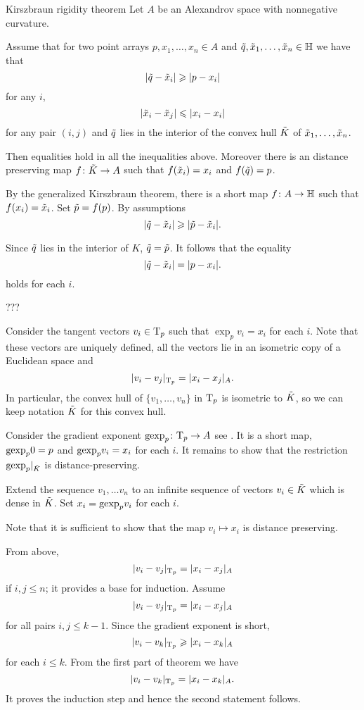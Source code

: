 \begin{thm}{Kirszbraun rigidity theorem}\label{thm:kirszbraun-rigid}
Let $A$ be an Alexandrov space with nonnegative curvature.

Assume that for two point arrays $p,x_1,\dots,x_n\in A$ and $\~q, \~x_1,\dots,\~x_n\in \HH$ we have that 
\[|\~q-\~x_i|\ge |p-x_i|\]
for any $i$,
\[|\~x_i-\~x_j|\le |x_i-x_i|\]
for any pair $(i,j)$
and $\~q$ lies in the interior of the convex hull $\~K$ of $\~x_1,\dots,\~x_n$.

Then equalities hold in all the inequalities above.
Moreover there is an distance preserving map $f\:\~K\to A$ such that $f(\~x_i)=x_i$ and $f(\~q)=p$. 
\end{thm}

By the generalized Kirszbraun theorem, there is a short map $f\:A\to \HH$
such that $f(x_i)=\~x_i$.
Set  $\~p=f(p)$.
By assumptions
\[|\~q-\~x_i|\ge |\~p-\~x_i|.\]

Since $\~q$ lies in the interior of $K$, $\~q=\~p$.
It follows that the equality 
\[|\~q-\~x_i|= |p-x_i|.\]
holds for each $i$.

???

Consider the tangent vectors $v_i\in\T_p$ such that $\exp_pv_i=x_i$ for each $i$.
Note that these vectors are uniquely defined,
all  the vectors lie in an isometric copy of a Euclidean space
and 
\[|v_i-v_j|_{\T_p}=|x_i-x_j|_A.\]
In particular, the convex hull of $\{v_1,\dots,v_n\}$ in $\T_p$ is isometric to $\~K$,
so we can keep notation  $\~K$ for this convex hull.

Consider the gradient exponent $\gexp_p\:\T_p\to A$ see \cite{AKP-book}.
It is a short map, $\gexp_p0=p$ and $\gexp_p v_i=x_i$ for each $i$.
It remains to show that the restriction $\gexp_p|_{\~K}$ is distance-preserving.

Extend the sequence $v_1,\dots v_n$ to an infinite sequence of vectors $v_i\in\~K$ which is dense in $\~K$.
Set $x_i=\gexp_pv_i$ for each $i$.

Note that it is sufficient to show that the map $v_i\mapsto x_i$ is distance preserving.

From above,
\[|v_i-v_j|_{\T_p}=|x_i-x_j|_A\]
if $i,j\le n$; it provides a base for induction.
Assume 
\[|v_i-v_j|_{\T_p}=|x_i-x_j|_A\]
for all pairs $i,j\le k-1$.
Since the gradient exponent is short,
\[|v_i-v_k|_{\T_p}\ge|x_i-x_k|_A\]
for each $i\le k$.
From the first part of theorem we have 
\[|v_i-v_k|_{\T_p}=|x_i-x_k|_A.\]
It proves the induction step and hence the second statement follows.
\qeds
